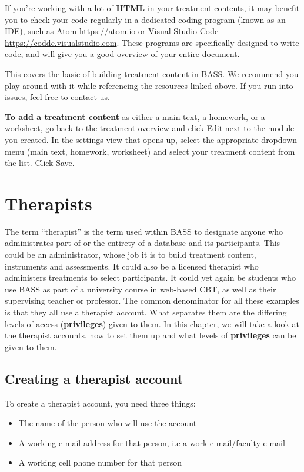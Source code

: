 \documentclass[
]{book}
\providecommand{\tightlist}{%
  \setlength{\itemsep}{0pt}\setlength{\parskip}{0pt}}
\begin{document}
If you're working with a lot of \textbf{HTML} in your treatment contents, it may benefit you to check your code regularly in a dedicated coding program (known as an IDE), such as Atom \url{https://atom.io} or Visual Studio Code \href{https://code.visualstudio.com}{https://codde.visualstudio.com}. These programs are specifically designed to write code, and will give you a good overview of your entire document.

This covers the basic of building treatment content in BASS. We recommend you play around with it while referencing the resources linked above. If you run into issues, feel free to contact us.

\textbf{To add a treatment content} as either a main text, a homework, or a worksheet, go back to the treatment overview and click Edit next to the module you created. In the settings view that opens up, select the appropriate dropdown menu (main text, homework, worksheet) and select your treatment content from the list. Click Save.

\chapter{Therapists}\label{therapists}

The term ``therapist'' is the term used within BASS to designate anyone who administrates part of or the entirety of a database and its participants. This could be an administrator, whose job it is to build treatment content, instruments and assessments. It could also be a licensed therapist who administers treatments to select participants. It could yet again be students who use BASS as part of a university course in web-based CBT, as well as their supervising teacher or professor.
The common denominator for all these examples is that they all use a therapist account. What separates them are the differing levels of access (\textbf{privileges}) given to them. In this chapter, we will take a look at the therapist accounts, how to set them up and what levels of \textbf{privileges} can be given to them.

\section{Creating a therapist account}\label{creating-a-therapist-account}

To create a therapist account, you need three things:

\begin{itemize}
\tightlist
\item
  The name of the person who will use the account
\item
  A working e-mail address for that person, i.e a work e-mail/faculty e-mail
\item
  A working cell phone number for that person
\end{itemize}
\end{document}
